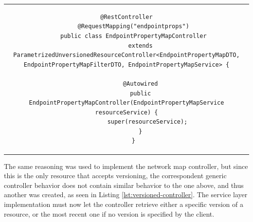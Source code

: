 \begin{center}
\begin{tabular}{c}
\begin{lstlisting}[frame=tlrb, caption=Concrete controller extending from a parametrized one, label={lst:endpoint-property-map-controller}, basicstyle=\tiny]
    @RestController
    @RequestMapping("endpointprops")
    public class EndpointPropertyMapController
        extends ParametrizedUnversionedResourceController<EndpointPropertyMapDTO, EndpointPropertyMapFilterDTO, EndpointPropertyMapService> {

        @Autowired
        public EndpointPropertyMapController(EndpointPropertyMapService resourceService) {
            super(resourceService);
        }
    }

\end{lstlisting}
\end{tabular}
\end{center}

    The same reasoning was used to implement the network map controller, but since this is the only resource that accepts versioning, the correspondent generic controller behavior does not contain similar behavior to the one above, and thus another was created, as seen in Listing \ref{lst:versioned-controller}.
    The service layer implementation must now let the controller retrieve either a specific version of a resource, or the most recent one if no version is specified by the client.


